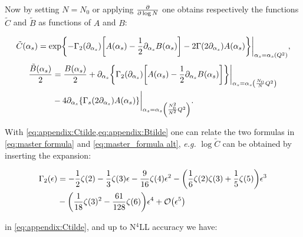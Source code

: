 \documentclass[../Tesi_Jiahao_Miao_986136.tex]{subfiles}
\begin{document}
Now by setting $N=N_0$ or applying $\pdv{\log N}$ one obtains respectively the functions $\tilde{C}$ and  $\tilde{B}$ as functions of $A$ and $B$:

\begin{equation}\label{eq:appendix:Ctilde}
    \tilde{C}(\alpha_s) = \exp{-\Gamma_2(\partial_{\alpha_s}) \qty[A(\alpha_s)-\frac{1}{2} \partial_{\alpha_s}B(\alpha_s)]- 2 \Gamma\qty(2\partial_{\alpha_s}) A(\alpha_s)}\biggr\rvert_{\alpha_s=\alpha_s\qty(Q^2)} ,
\end{equation}
\begin{equation}\label{eq:appendix:Btilde}
    \begin{split}
    \frac{\tilde{B}(\alpha_s)}{2} &= \frac{B(\alpha_s)}{2} + \partial_{\alpha_s} \qty{\Gamma_2(\partial_{\alpha_s}) \qty[A(\alpha_s)-\frac{1}{2} \partial_{\alpha_s}B(\alpha_s)]} \biggr \rvert_{\alpha_s = \alpha_s\qty(\frac{N_0}{N}Q^2)}\\
    &- 4 \partial_{\alpha_s} \qty{\Gamma_s\qty(2\partial_{\alpha_s}) A(\alpha_s)}\biggr\rvert_{\alpha_s=\alpha_s\qty(\frac{N_0^2}{N^2}Q^2)} .
\end{split}
\end{equation}

With \cref{eq:appendix:Ctilde,eq:appendix:Btilde} one can relate the two formulas in \cref{eq:master formula} and \cref{eq:master_formula alt},
\emph{e.g.} $\log \tilde{C}$ can be obtained by inserting the expansion:

\begin{align}
    \begin{split}
    \Gamma_2(\epsilon) &= -\frac{1}{2}\zeta(2) -\frac{1}{3}\zeta(3) \epsilon - \frac{9}{16}\zeta(4) \epsilon^2 - \qty(\frac{1}{6}\zeta(2)\zeta(3)+ \frac{1}{5}\zeta(5))\epsilon^3 \\
    &- \qty(\frac{1}{18}\zeta(3)^2 - \frac{61}{128}\zeta(6))\epsilon^4 + \order{\epsilon^5}
    \end{split}
\end{align}

in \cref{eq:appendix:Ctilde}, and up to N$^4$LL accuracy we have: 
\end{document}
